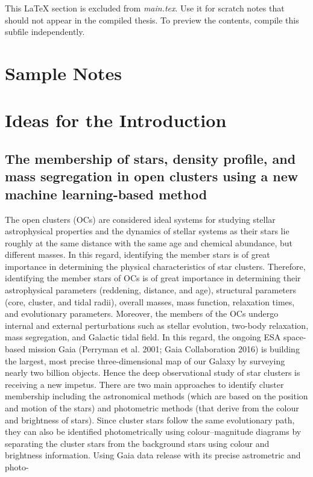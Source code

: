 \documentclass[../main.tex]{subfiles}
\begin{document}
This LaTeX section is excluded from \textit{main.tex}. Use it for scratch notes that should not appear in the compiled thesis. To preview the contents, compile this subfile independently.

\section{Sample Notes}

\section{Ideas for the Introduction}

\subsection{The membership of stars, density profile, and mass segregation in open clusters using a new machine learning-based method} %
The open clusters (OCs) are considered ideal systems for studying stellar astrophysical properties and the dynamics of stellar systems as their stars lie roughly at the same distance with the same age and chemical abundance, but different masses. In this regard, identifying the member stars is of great importance in determining the physical characteristics of star clusters. Therefore, identifying the member stars of OCs is of great importance in determining their astrophysical parameters (reddening, distance, and age), structural parameters (core, cluster, and tidal radii), overall masses, mass function, relaxation times, and evolutionary parameters. Moreover, the members of the OCs undergo internal and external perturbations such as stellar evolution, two-body relaxation, mass segregation, and Galactic tidal field. In this regard, the ongoing ESA space-based mission Gaia (Perryman et al. 2001; Gaia Collaboration 2016) is building the largest, most precise three-dimensional map of our Galaxy by surveying nearly two billion objects. Hence the deep observational study of star clusters is receiving a new impetus. There are two main approaches to identify cluster membership including the astronomical methods (which are based on the position and motion of the stars) and photometric methods (that derive from the colour and brightness of stars). Since cluster stars follow the same evolutionary path, they can also be identified photometrically using colour–magnitude diagrams by separating the cluster stars from the background stars using colour and brightness information. Using Gaia data release with its precise astrometric and photo-
\end{document}
